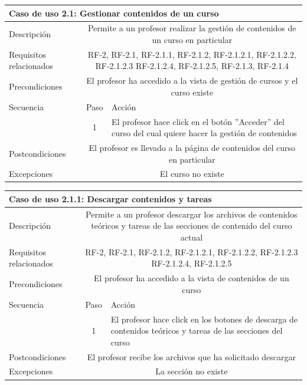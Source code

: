 \hspace{3cm}

\begin{tabular}[H]{l c l}
\toprule 
\multicolumn{3}{l}{\textbf{Caso de uso 2.1: Gestionar contenidos de un curso}}\\
\midrule
Descripción & \multicolumn{2}{p{10cm}}{Permite a un profesor realizar la gestión de contenidos de un curso en particular}\\
\midrule
Requisitos relacionados & \multicolumn{2}{p{10cm}}{RF-2, RF-2.1, RF-2.1.1, RF-2.1.2, RF-2.1.2.1, RF-2.1.2.2, RF-2.1.2.3
RF-2.1.2.4, RF-2.1.2.5, RF-2.1.3, RF-2.1.4}\\
\midrule
Precondiciones & \multicolumn{2}{p{10cm}}{El profesor ha accedido a la vista de gestión de cursos y el curso existe}\\
\midrule
Secuencia & Paso & Acción \\
\cmidrule{2-3}
         & 1 &  \multicolumn{1}{p{8cm}}{El profesor hace click en el botón ''Acceder'' del curso del cual quiere hacer la gestión de contenidos}\\

\midrule
Postcondiciones & \multicolumn{2}{p{10cm}}{El profesor es llevado a la página de contenidos del curso en particular}\\
\midrule
Excepciones & \multicolumn{2}{p{10cm}}{El curso no existe}\\
\bottomrule 
\end{tabular}

\hspace{3cm}


\begin{tabular}[H]{l c l}
\toprule 
\multicolumn{3}{l}{\textbf{Caso de uso 2.1.1: Descargar contenidos y tareas}}\\
\midrule
Descripción & \multicolumn{2}{p{10cm}}{Permite a un profesor descargar los archivos de contenidos teóricos y tareas de las secciones de contenido del curso actual }\\
\midrule
Requisitos relacionados & \multicolumn{2}{p{10cm}}{RF-2, RF-2.1, RF-2.1.2, RF-2.1.2.1, RF-2.1.2.2, RF-2.1.2.3
RF-2.1.2.4, RF-2.1.2.5}\\
\midrule
Precondiciones & \multicolumn{2}{p{10cm}}{El profesor ha accedido a la vista de contenidos de un curso}\\
\midrule
Secuencia & Paso & Acción \\
\cmidrule{2-3}
         & 1 &  \multicolumn{1}{p{8cm}}{El profesor hace click en los botones de descarga de contenidos teóricos y tareas de las secciones del curso}\\
\midrule
Postcondiciones & \multicolumn{2}{p{10cm}}{El profesor recibe los archivos que ha solicitado descargar}\\
\midrule
Excepciones & \multicolumn{2}{p{10cm}}{La sección no existe}\\
\bottomrule 
\end{tabular}

